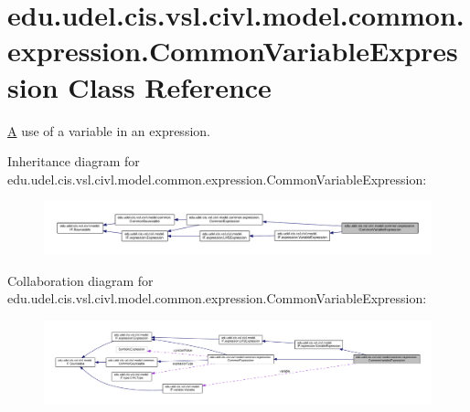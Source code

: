 \hypertarget{classedu_1_1udel_1_1cis_1_1vsl_1_1civl_1_1model_1_1common_1_1expression_1_1CommonVariableExpression}{}\section{edu.\+udel.\+cis.\+vsl.\+civl.\+model.\+common.\+expression.\+Common\+Variable\+Expression Class Reference}
\label{classedu_1_1udel_1_1cis_1_1vsl_1_1civl_1_1model_1_1common_1_1expression_1_1CommonVariableExpression}


\hyperlink{structA}{A} use of a variable in an expression.  




Inheritance diagram for edu.\+udel.\+cis.\+vsl.\+civl.\+model.\+common.\+expression.\+Common\+Variable\+Expression\+:
\nopagebreak
\begin{figure}[H]
\begin{center}
\leavevmode
\includegraphics[width=350pt]{classedu_1_1udel_1_1cis_1_1vsl_1_1civl_1_1model_1_1common_1_1expression_1_1CommonVariableExpression__inherit__graph}
\end{center}
\end{figure}


Collaboration diagram for edu.\+udel.\+cis.\+vsl.\+civl.\+model.\+common.\+expression.\+Common\+Variable\+Expression\+:
\nopagebreak
\begin{figure}[H]
\begin{center}
\leavevmode
\includegraphics[width=350pt]{classedu_1_1udel_1_1cis_1_1vsl_1_1civl_1_1model_1_1common_1_1expression_1_1CommonVariableExpression__coll__graph}
\end{center}
\end{figure}
